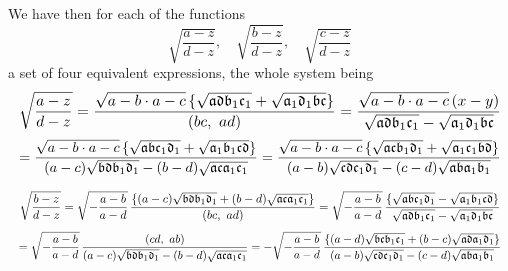 \documentclass[11pt]{article}
\begin{document}
We have then for each of the functions
\[ \sqrt{\frac{a-z}{d-z}},\quad \sqrt{\frac{b-z}{d-z}},\quad \sqrt{\frac{c-z}{d-z}} \]
a set of four equivalent expressions, the whole system being
\[ \resizebox{\textwidth}{!}{$\displaystyle \sqrt{\frac{a-z}{d-z}} = \frac{\sqrt{a-b\cdot a-c}\,\{\sqrt{\mathfrak{a}\mathfrak{d}\mathfrak{b}_{1}\mathfrak{c}_{1}} + \sqrt{\mathfrak{a}_{1}\mathfrak{d}_{1}\mathfrak{b}\mathfrak{c}}\}}{(bc,\ ad)} = \frac{\sqrt{a-b\cdot a-c}\,(x-y)}{\sqrt{\mathfrak{a}\mathfrak{d}\mathfrak{b}_{1}\mathfrak{c}_{1}} - \sqrt{\mathfrak{a}_{1}\mathfrak{d}_{1}\mathfrak{b}\mathfrak{c}}}$} \]
\[ \resizebox{\textwidth}{!}{$\displaystyle = \frac{\sqrt{a-b\cdot a-c}\,\{\sqrt{\mathfrak{a}\mathfrak{b}\mathfrak{c}_{1}\mathfrak{d}_{1}} + \sqrt{\mathfrak{a}_{1}\mathfrak{b}_{1}\mathfrak{c}\mathfrak{d}}\}}{(a-c)\sqrt{\mathfrak{b}\mathfrak{d}\mathfrak{b}_{1}\mathfrak{d}_{1}} - (b-d)\sqrt{\mathfrak{a}\mathfrak{c}\mathfrak{a}_{1}\mathfrak{c}_{1}}} = \frac{\sqrt{a-b\cdot a-c}\,\{\sqrt{\mathfrak{a}\mathfrak{c}\mathfrak{b}_{1}\mathfrak{d}_{1}} + \sqrt{\mathfrak{a}_{1}\mathfrak{c}_{1}\mathfrak{b}\mathfrak{d}}\}}{(a-b)\sqrt{\mathfrak{c}\mathfrak{d}\mathfrak{c}_{1}\mathfrak{d}_{1}} - (c-d)\sqrt{\mathfrak{a}\mathfrak{b}\mathfrak{a}_{1}\mathfrak{b}_{1}}}$} \]

\[ \resizebox{\textwidth}{!}{$\displaystyle \sqrt{\frac{b-z}{d-z}} = \sqrt{-\frac{a-b}{a-d}}\,\frac{\{(a-c)\sqrt{\mathfrak{b}\mathfrak{d}\mathfrak{b}_{1}\mathfrak{d}_{1}} + (b-d)\sqrt{\mathfrak{a}\mathfrak{c}\mathfrak{a}_{1}\mathfrak{c}_{1}}\}}{(bc,\ ad)} = \sqrt{-\frac{a-b}{a-d}}\,\frac{\{\sqrt{\mathfrak{a}\mathfrak{b}\mathfrak{c}_{1}\mathfrak{d}_{1}} - \sqrt{\mathfrak{a}_{1}\mathfrak{b}_{1}\mathfrak{c}\mathfrak{d}}\}}{\sqrt{\mathfrak{a}\mathfrak{d}\mathfrak{b}_{1}\mathfrak{c}_{1}} - \sqrt{\mathfrak{a}_{1}\mathfrak{d}_{1}\mathfrak{b}\mathfrak{c}}}$} \]
\[ \resizebox{\textwidth}{!}{$\displaystyle = \sqrt{-\frac{a-b}{a-d}}\,\frac{(cd,\ ab)}{(a-c)\sqrt{\mathfrak{b}\mathfrak{d}\mathfrak{b}_{1}\mathfrak{d}_{1}} - (b-d)\sqrt{\mathfrak{a}\mathfrak{c}\mathfrak{a}_{1}\mathfrak{c}_{1}}} = -\sqrt{-\frac{a-b}{a-d}}\,\frac{\{(a-d)\sqrt{\mathfrak{b}\mathfrak{c}\mathfrak{b}_{1}\mathfrak{c}_{1}} + (b-c)\sqrt{\mathfrak{a}\mathfrak{d}\mathfrak{a}_{1}\mathfrak{d}_{1}}\}}{(a-b)\sqrt{\mathfrak{c}\mathfrak{d}\mathfrak{c}_{1}\mathfrak{d}_{1}} - (c-d)\sqrt{\mathfrak{a}\mathfrak{b}\mathfrak{a}_{1}\mathfrak{b}_{1}}}$} \]
\end{document}
